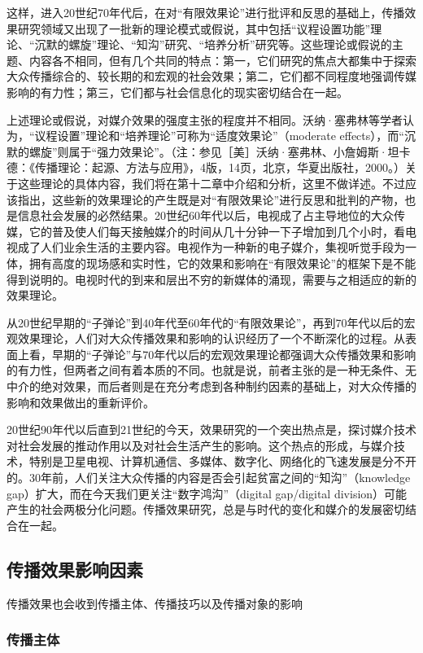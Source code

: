 \documentclass[UTF8,12pt]{ctexart}
\numberwithin{equation}{section} %
\numberwithin{figure}{section}
\numberwithin{table}{section}
\begin{document}
	这样，进入20世纪70年代后，在对“有限效果论”进行批评和反思的基础上，传播效果研究领域又出现了一批新的理论模式或假说，其中包括“议程设置功能”理论、“沉默的螺旋”理论、“知沟”研究、“培养分析”研究等。这些理论或假说的主题、内容各不相同，但有几个共同的特点：第一，它们研究的焦点大都集中于探索大众传播综合的、较长期的和宏观的社会效果；第二，它们都不同程度地强调传媒影响的有力性；第三，它们都与社会信息化的现实密切结合在一起。
	
	上述理论或假说，对媒介效果的强度主张的程度并不相同。沃纳·塞弗林等学者认为，“议程设置”理论和“培养理论”可称为“适度效果论”（moderate effects），而“沉默的螺旋”则属于“强力效果论”。（注：参见［美］沃纳·塞弗林、小詹姆斯·坦卡德：《传播理论：起源、方法与应用》，4版，14页，北京，华夏出版社，2000。）关于这些理论的具体内容，我们将在第十二章中介绍和分析，这里不做详述。不过应该指出，这些新的效果理论的产生既是对“有限效果论”进行反思和批判的产物，也是信息社会发展的必然结果。20世纪60年代以后，电视成了占主导地位的大众传媒，它的普及使人们每天接触媒介的时间从几十分钟一下子增加到几个小时，看电视成了人们业余生活的主要内容。电视作为一种新的电子媒介，集视听觉手段为一体，拥有高度的现场感和实时性，它的效果和影响在“有限效果论”的框架下是不能得到说明的。电视时代的到来和层出不穷的新媒体的涌现，需要与之相适应的新的效果理论。
	
	从20世纪早期的“子弹论”到40年代至60年代的“有限效果论”，再到70年代以后的宏观效果理论，人们对大众传播效果和影响的认识经历了一个不断深化的过程。从表面上看，早期的“子弹论”与70年代以后的宏观效果理论都强调大众传播效果和影响的有力性，但两者之间有着本质的不同。也就是说，前者主张的是一种无条件、无中介的绝对效果，而后者则是在充分考虑到各种制约因素的基础上，对大众传播的影响和效果做出的重新评价。
	
	20世纪90年代以后直到21世纪的今天，效果研究的一个突出热点是，探讨媒介技术对社会发展的推动作用以及对社会生活产生的影响。这个热点的形成，与媒介技术，特别是卫星电视、计算机通信、多媒体、数字化、网络化的飞速发展是分不开的。30年前，人们关注大众传播的内容是否会引起贫富之间的“知沟”（knowledge gap）扩大，而在今天我们更关注“数字鸿沟”（digital gap/digital division）可能产生的社会两极分化问题。传播效果研究，总是与时代的变化和媒介的发展密切结合在一起。
	
	\subsection{传播效果影响因素}
	传播效果也会收到传播主体、传播技巧以及传播对象的影响
	
	\subsubsection{传播主体}
	
\end{document}
